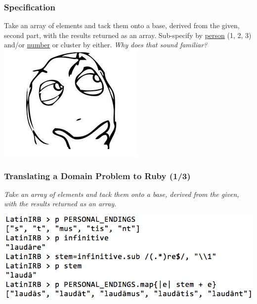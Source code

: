 \documentclass[slidestop,compress,mathserif]{beamer}
\begin{document}
\begin{frame}
	\frametitle{Specification}
	Take an array of elements and tack them onto a base, derived from the given, second part,
with the results returned as an array.  Sub-specify by \underline{person} (1, 2, 3) and/or \underline{number} or cluster by either.
	\pause
	\vskip 0.5cm
	\emph{Why does that sound familiar?}
	\vskip 0.5cm
	\includegraphics[scale=0.45]{img/determined.png}
\end{frame}


\begin{frame}
	\frametitle{Translating a Domain Problem to Ruby (1/3)} 
	\emph{Take an array of elements and tack them onto a base, derived from the
    given, with the results returned as an array.
}	\begin{center}
		\includegraphics[scale=0.38]{img/conj_how.png}	
	\end{center}
\end{frame}
\end{document}
